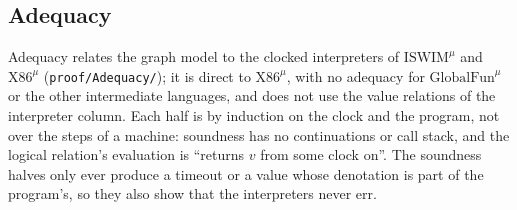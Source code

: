 \documentclass[10pt]{article}
\theoremstyle{acmplain}
\newcommand{\Ml}[1]{\textrm{#1}^{\mu}}                  %
\begin{document}
\subsection{Adequacy}\label{sec:m-adequacy}

Adequacy relates the graph model to the clocked interpreters of
$\Ml{ISWIM}$ and $\Ml{X86}$ (\texttt{proof/Adequacy/}); it is direct to
$\Ml{X86}$, with no adequacy for $\Ml{GlobalFun}$ or the other intermediate
languages, and does not use the value relations of the interpreter
column. Each half is by induction on the clock and the program, not over
the steps of a machine: soundness has no continuations or call stack,
and the logical relation's evaluation is ``returns $v$ from some clock
on''. The soundness halves only ever produce a timeout or a value whose
denotation is part of the program's, so they also show that the
interpreters never err.
\end{document}
